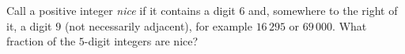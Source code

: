 Call a positive integer \emph{nice} if it contains a digit $6$ and, somewhere to the right of it, a digit $9$ (not necessarily adjacent), for example $16\,295$ or $69\,000$. What fraction of the $5$-digit integers are nice?
